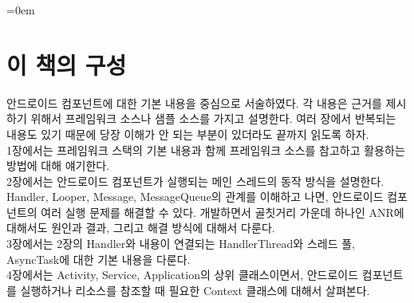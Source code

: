 \documentclass[a4paper,hidelinks,10pt,openany]{book} %
\begin{document}
\parindent=0em


\newpage

\begin{comment}
\begin{abstract}
잘 만든 앱은 다 그럭저럭이지만, 그렇지 않은 앱은 제각각의 이유가 있다. 여기서는 그럭저럭한 앱을 만드는 원리와 방법을 찾아보고, 문제를 발생시키는 제각각의 이유에 대해서도 얘기해보자.
\end{abstract}
\end{comment}

\chapter*{이 책의 구성}
안드로이드 컴포넌트에 대한 기본 내용을 중심으로 서술하였다. 각 내용은 근거를 제시하기 위해서 프레임워크 소스나 샘플 소스를 가지고 설명한다.
여러 장에서 반복되는 내용도 있기 때문에 당장 이해가 안 되는 부분이 있더라도 끝까지 읽도록 하자.\\

1장에서는 프레임워크 스택의 기본 내용과 함께 프레임워크 소스를 참고하고 활용하는 방법에 대해 얘기한다.\\

2장에서는 안드로이드 컴포넌트가 실행되는 메인 스레드의 동작 방식을 설명한다.
Handler, Looper, Message, MessageQueue의 관계를 이해하고 나면, 안드로이드 컴포넌트의 여러 실행 문제를 해결할 수 있다. 
개발하면서 골칫거리 가운데 하나인 ANR에 대해서도 원인과 결과, 그리고 해결 방식에 대해서 다룬다.\\

3장에서는 2장의 Handler와 내용이 연결되는 HandlerThread와 스레드 풀, AsyncTask에 대한 기본 내용을 다룬다.\\

4장에서는 Activity, Service, Application의 상위 클래스이면서, 안드로이드 컴포넌트를 실행하거나 리소스를 참조할 때 필요한 Context 클래스에 대해서 살펴본다.\\
\end{document}
